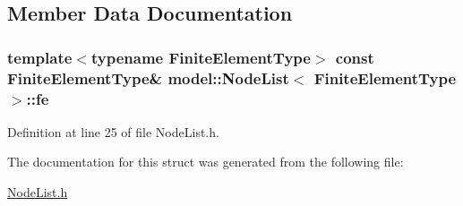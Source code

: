 \subsection{Member Data Documentation}
\hypertarget{structmodel_1_1_node_list_a72754d71ac0dcf9e1836bba4ae1071f1}{}
\subsubsection[{fe}]{\setlength{\rightskip}{0pt plus 5cm}template$<$typename Finite\+Element\+Type$>$ const Finite\+Element\+Type\& {\bf model\+::\+Node\+List}$<$ Finite\+Element\+Type $>$\+::fe}\label{structmodel_1_1_node_list_a72754d71ac0dcf9e1836bba4ae1071f1}


Definition at line 25 of file Node\+List.\+h.



The documentation for this struct was generated from the following file\+:\begin{DoxyCompactItemize}
\item 
\hyperlink{_node_list_8h}{Node\+List.\+h}\end{DoxyCompactItemize}
